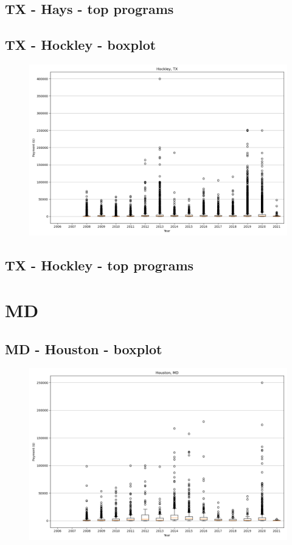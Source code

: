 \subsection*{TX - Hays - top programs}

\newpage
\subsection*{TX - Hockley - boxplot}
\begin{figure}[h]
\centering
\includegraphics[width=7in]{../output/boxplots/counties/Hockley-TX_boxplot.png}
\end{figure}


\subsection*{TX - Hockley - top programs}

\newpage
\section*{MD}
\subsection*{MD - Houston - boxplot}
\begin{figure}[h]
\centering
\includegraphics[width=7in]{../output/boxplots/counties/Houston-MD_boxplot.png}
\end{figure}


